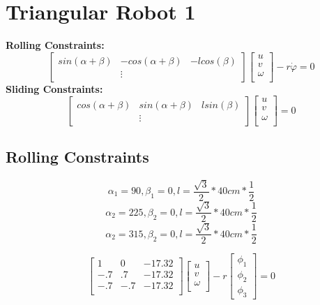 \section{Triangular Robot 1}
\bf{Rolling Constraints:}
$$
\begin{bmatrix} 
sin(\alpha + \beta) & -cos(\alpha + \beta) & -lcos(\beta) \\
& \vdots &
\end{bmatrix}
\begin{bmatrix} 
u \\
v \\
\omega \\
\end{bmatrix} 
-
r \dot{\varphi}
= 0
$$
\bf{Sliding Constraints:}
$$
\begin{bmatrix} 
cos(\alpha + \beta) & sin(\alpha + \beta) & lsin(\beta) \\
& \vdots &
\end{bmatrix}
\begin{bmatrix} 
u \\
v \\
\omega \\
\end{bmatrix} 
= 0
$$

\subsection{Rolling Constraints}
$$
\alpha_1 =  90, 
\beta_1 = 0,
l = \dfrac{\sqrt{3}}{2} * 40cm * \dfrac{1}{2}
$$
$$
\alpha_2 =  225, 
\beta_2 = 0,
l = \dfrac{\sqrt{3}}{2} * 40cm * \dfrac{1}{2}
$$
$$
\alpha_2 =  315, 
\beta_2 = 0,
l = \dfrac{\sqrt{3}}{2} * 40cm * \dfrac{1}{2}
$$

$$
\begin{bmatrix} 
1 & 0 & -17.32\\
-.7 & .7 & -17.32\\
-.7 & -.7 & -17.32\\
\end{bmatrix} 
\begin{bmatrix} 
u \\
v \\
\omega \\
\end{bmatrix} 
- r 
 \begin{bmatrix} 
\phi_1 \\
\phi_2 \\
\phi_3
\end{bmatrix}
= 0
$$


